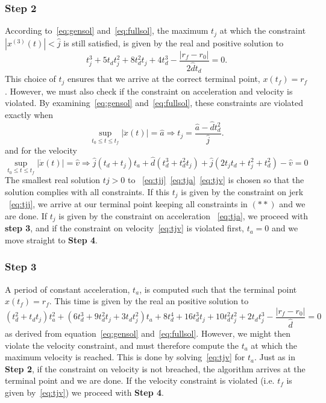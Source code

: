 \documentclass{article}
\begin{document}
\subsubsection*{Step 2}
According to~\eqref{eq:gensol} and~\eqref{eq:fullsol}, the maximum $t_j$ at which the constraint $|x^{(3)}(t)| < \hat{j}$ is still satisfied, is given by the real and positive solution to
\begin{equation}\label{eq:tjj}
t_j^3 + 5t_dt_j^2 + 8t_d^2t_j + 4t_d^3-\dfrac{|r_f - r_0|}{2\hat{d}t_d} = 0.
\end{equation}
This choice of $t_j$ ensures that we arrive at the correct terminal point, $x(t_f) = r_f$. However, we must also check if the constraint on acceleration and velocity is violated. By examining~\eqref{eq:gensol} and~\eqref{eq:fullsol}, these constraints are violated exactly when
\begin{equation}\label{eq:tja}
\sup\limits_{t_0\leq t\leq t_f}|\ddot{x}(t)| = \hat{a} \Rightarrow t_j = \dfrac{\hat{a}- \hat{d}t_d^2}{\hat{j}}.
\end{equation}
and for the velocity
\begin{equation}\label{eq:tjv}
\sup\limits_{t_0\leq t\leq t_f}|\dot{x}(t)| = \hat{v} \Rightarrow
\hat{j}(t_d + t_j)t_a + \hat{d}(t_d^3 + t_d^2t_j)+ \hat{j}(2t_jt_d + t_j^2+t_d^2)-\hat{v} =0
\end{equation}
The smallest real solution $tj>0$ to ~\eqref{eq:tjj}~\eqref{eq:tja}~\eqref{eq:tjv} is chosen so that the solution complies with all constraints.
If this $t_j$ is given by the constraint on jerk ~\eqref{eq:tjj}, we arrive at our terminal point keeping all constraints in $(**)$ and we are done.
If $t_j$ is given by the constraint on acceleration ~\eqref{eq:tja}, we proceed with \textbf{step 3}, and if the constraint on velocity~\eqref{eq:tjv} is violated first, $t_a = 0$ and we move straight to \textbf{Step 4}.

\subsubsection*{Step 3}
A period of constant acceleration, $t_a$, is computed such that the terminal point $x(t_f) = r_f$. This time is given by the real an positive solution to
\begin{equation}
(t_d^2+t_dt_j)t_a^2+
(6t_d^3+9t_d^2t_j+3t_dt_j^2)t_a+
8t_d^4+16t_d^3t_j+10t_d^2t_j^2+2t_dt_j^3-\dfrac{|r_f - r_0|}{\hat{d}} = 0
\end{equation}
as derived from equation~\eqref{eq:gensol} and~\eqref{eq:fullsol}. However, we might then violate the velocity constraint, and must therefore compute the $t_a$ at which the maximum velocity is reached. This is done by solving~\eqref{eq:tjv} for $t_a$. Just as in \textbf{Step 2}, if the constraint on velocity is not breached, the algorithm arrives at the terminal point and we are done. If the velocity constraint is violated (i.e. $t_f$ is given by~\eqref{eq:tjv}) we proceed with \textbf{Step 4}.
\end{document}

